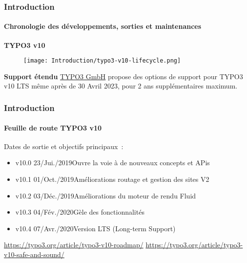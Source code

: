 
\begin{frame}[fragile]
	\frametitle{Introduction}
	\framesubtitle{Chronologie des développements, sorties et maintenances}

	\textbf{TYPO3 v10}

	\begin{figure}
		\texttt{[image: Introduction/typo3-v10-lifecycle.png]}
	\end{figure}

	\textbf{Support étendu}\newline
	\smaller
		\href{https://typo3.com}{TYPO3 GmbH} propose des options de support pour TYPO3
		v10 LTS même après de 30 Avril 2023, pour 2 ans supplémentaires maximum.
	\normalsize

\end{frame}


\begin{frame}[fragile]
	\frametitle{Introduction}
	\framesubtitle{Feuille de route TYPO3 v10}

	Dates de sortie et objectifs principaux~:

	\begin{itemize}

		\item
			\begingroup
				\color{typo3orange}
				v10.0 \tabto{1.1cm}23/Jui./2019\tabto{3.4cm}Ouvre la voie à de nouveaux concepts et APis
			\endgroup
		\item v10.1 \tabto{1.1cm}01/Oct./2019\tabto{3.4cm}Améliorations routage et gestion des sites V2
		\item v10.2 \tabto{1.1cm}03/Déc./2019\tabto{3.4cm}Améliorations du moteur de rendu Fluid
		\item v10.3 \tabto{1.1cm}04/Fév./2020\tabto{3.4cm}Gèle des fonctionnalités
		\item v10.4 \tabto{1.1cm}07/Avr./2020\tabto{3.4cm}Version LTS (Long-term Support)

	\end{itemize}

	\smaller
		\url{https://typo3.org/article/typo3-v10-roadmap/}\newline
		\url{https://typo3.org/article/typo3-v10-safe-and-sound/}
	\normalsize

\end{frame}

